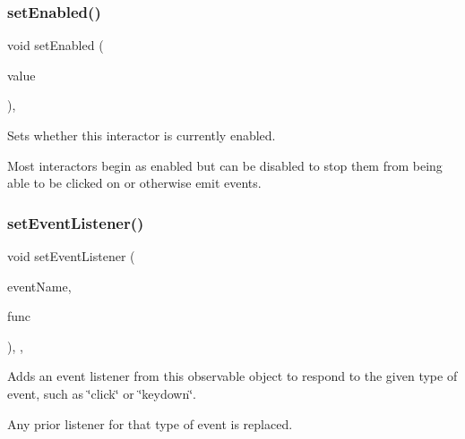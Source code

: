 \subsubsection{\texorpdfstring{set\+Enabled()}{setEnabled()}}
{\footnotesize\ttfamily void set\+Enabled (\begin{DoxyParamCaption}\item[{bool}]{value }\end{DoxyParamCaption})\hspace{0.3cm}{\ttfamily [virtual]}, {\ttfamily [inherited]}}



Sets whether this interactor is currently enabled. 

Most interactors begin as enabled but can be disabled to stop them from being able to be clicked on or otherwise emit events. \mbox{\label{classsgl_1_1GObservable_ad2f6d34961c50f6c1e0659990b79f741}} 
\subsubsection{\texorpdfstring{set\+Event\+Listener()}{setEventListener()}\hspace{0.1cm}{\footnotesize\ttfamily [1/2]}}
{\footnotesize\ttfamily void set\+Event\+Listener (\begin{DoxyParamCaption}\item[{const std\+::string \&}]{event\+Name,  }\item[{\mbox{\hyperlink{namespacesgl_ae9f3e9eab70035da1a2b114e21357b25}{G\+Event\+Listener}}}]{func }\end{DoxyParamCaption})\hspace{0.3cm}{\ttfamily [protected]}, {\ttfamily [virtual]}, {\ttfamily [inherited]}}



Adds an event listener from this observable object to respond to the given type of event, such as \char`\"{}click\char`\"{} or \char`\"{}keydown\char`\"{}. 

Any prior listener for that type of event is replaced. \mbox{\label{classsgl_1_1GObservable_abac4cb9f9e626e010e87f5d91573c8a5}} 
